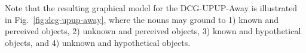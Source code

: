 Note that the resulting graphical model for the DCG-UPUP-Away is illustrated in Fig.~\ref{fig:dcg-upup-away}, where the nouns may ground to 1) known and perceived objects, 2) unknown and perceived objects, 3) known and hypothetical objects, and 4) unknown and hypothetical objects. 


